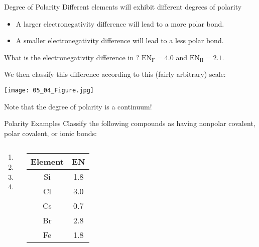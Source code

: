 \documentclass[notes=only]{beamer}
\begin{document}
\begin{frame}[allowframebreaks]{Degree of Polarity}
	Different elements will exhibit different \alert{degrees of
	polarity}
	\begin{itemize}
		\item A \alert{larger} electronegativity
			difference will lead to a \alert{more
			polar} bond.
		\item A \alert{smaller} electronegativity
			difference will lead to a \alert{less
			polar} bond.
	\end{itemize}

	\bigskip

	\begin{example}
		What is the electronegativity difference in ?
		$\text{EN}_\text{F} = 4.0$ and $\text{EN}_\text{H} = 2.1$.
	\end{example}


	\framebreak

	We then classify this difference according to this (fairly arbitrary)
	scale:
	\begin{center}
		\texttt{[image: 05\_04\_Figure.jpg]}

		Note that the degree of polarity is a
		\alert{continuum}!
	\end{center}
\end{frame}

\begin{frame}[t]{Polarity Examples}
	Classify the following compounds as having nonpolar covalent, polar
	covalent, or ionic bonds:

	\begin{columns}
		\begin{enumerate}
			\item {}
			\item {}
			\item {}
			\item {}
		\end{enumerate}
		\centering
		\begin{tabular} {c S[table-format=1.1]}
			\textbf{Element} & \textbf{EN} \\ \midrule
			Si & 1.8 \\
			Cl & 3.0 \\
			Cs & 0.7 \\
			Br & 2.8 \\
			Fe & 1.8 \\
		\end{tabular}
	\end{columns}

\end{frame}
\end{document}
